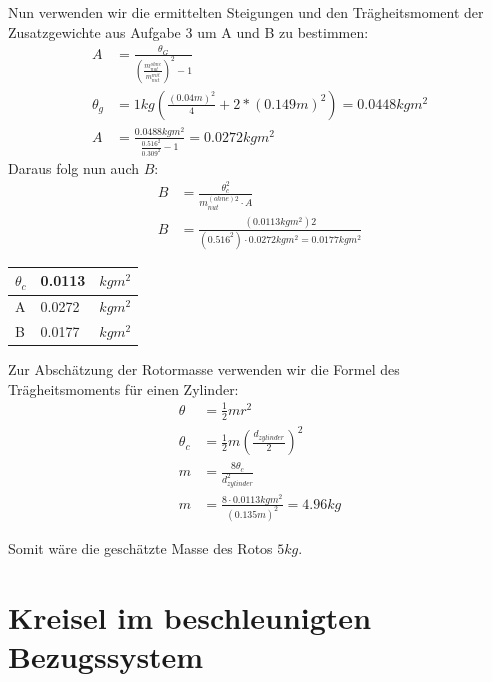 \documentclass{include/protokollclass}
\begin{document}
    Nun verwenden wir die ermittelten Steigungen und den Trägheitsmoment der Zusatzgewichte aus Aufgabe 3 um A und B zu bestimmen:
    \begin{align}
        A&=\frac{\theta_G}{\left(\frac{m_{nut}^{ohne}}{m_{nut}^{mit}}\right)^2-1}\\\theta_g&=1kg\left(\frac{(0.04m)^2}{4}+2*(0.149m)^2\right)=0.0448kgm^2\\A&=\frac{0.0488kgm^2}{\frac{0.516^2}{0.309^2}-1}=0.0272kgm^2
    \end{align}
    Daraus folg nun auch $B$:
    \begin{align}
    B&=\frac{\theta_c^2}{m_{nut}^{(ohne)2}\cdot A}\\
    B&=\frac{(0.0113kgm^2)2}{(0.516^2)\cdot 0.0272kgm^2=0.0177kgm^2}
    \end{align}

\begin{table}[h]
\centering
\begin{tabular}{|l|l|l|}
\hline
$\theta_c$ & 0.0113 & $kgm^2$ \\ \hline
A          & 0.0272 & $kgm^2$ \\ \hline
B          & 0.0177  & $kgm^2$ \\ \hline
\end{tabular}
\end{table}

Zur Abschätzung der Rotormasse verwenden wir die Formel des Trägheitsmoments für einen Zylinder:
\begin{align}
    \theta&=\frac{1}{2}mr^2\\
    \theta_c&=\frac{1}{2}m\left(\frac{d_{zylinder}}{2}\right)^2\\
    m&=\frac{8\theta_c}{d_{zylinder}^2}\\
    m&=\frac{8\cdot 0.0113kgm^2}{(0.135m)^2}=4.96kg
\end{align}

Somit wäre die geschätzte Masse des Rotos $5kg$.
    
    \chapter{Kreisel im beschleunigten Bezugssystem}
    
\end{document}
